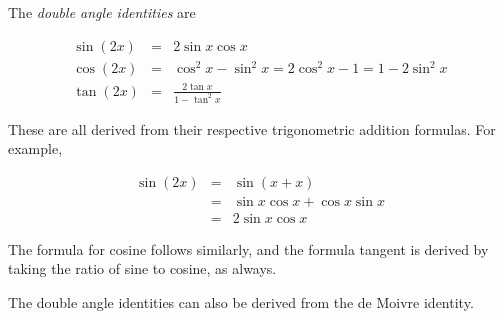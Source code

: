 \documentclass[12pt]{article}
\begin{document}

The \emph{double angle identities} are

\begin{eqnarray}
 \sin(2x) & = & 2\sin{x}\cos{x} \\
 \cos(2x) & = & \cos^2{x}-\sin^2{x} = 2\cos^2{x}-1 = 1-2\sin^2{x} \\
 \tan(2x) & = & \frac{2\tan{x}}{1-\tan^2{x}}
\end{eqnarray}

These are all derived from their respective trigonometric addition formulas.  For example,

\begin{eqnarray*}
 \sin(2x) & = & \sin(x+x) \\
          & = & \sin{x}\cos{x}+\cos{x}\sin{x} \\
          & = & 2\sin{x}\cos{x} 
\end{eqnarray*}

The formula for cosine follows similarly, and the formula tangent is derived by taking the ratio of sine to cosine, as always.

The double angle identities can also be derived from the de Moivre identity.
\end{document}
